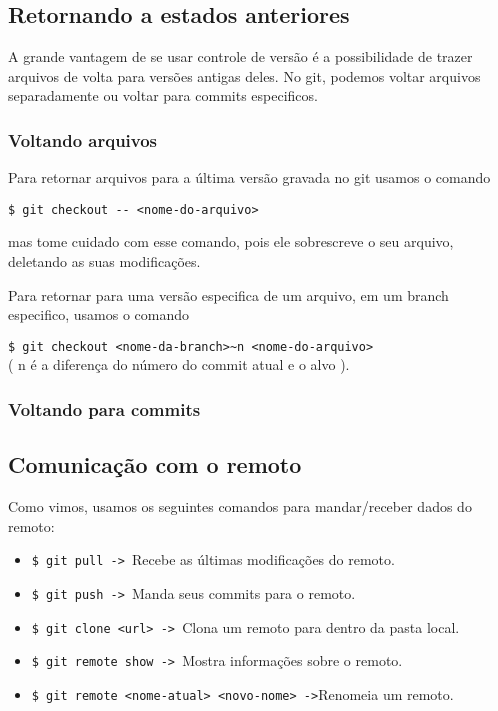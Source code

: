 \documentclass{article}
\begin{document}
\subsection{Retornando a estados anteriores}
    A grande vantagem de se usar controle de versão é a possibilidade de trazer
arquivos de volta para versões antigas deles. No git, podemos voltar arquivos
separadamente ou voltar para commits especificos.

\subsubsection{Voltando arquivos}
    Para retornar arquivos para a última versão gravada no git usamos o comando
    \begin{tabbing}
        \hspace{1cm}\=\verb#$ git checkout -- <nome-do-arquivo>#
    \end{tabbing}
mas tome cuidado com esse comando, pois ele sobrescreve o seu arquivo, deletando
as suas modificações.
    
    Para retornar para uma versão especifica de um arquivo, em um branch especifico,
usamos o comando
    \begin{tabbing}
        \hspace{1cm}\=\verb#$ git checkout <nome-da-branch>~n <nome-do-arquivo># \\
                    \>( n é  a diferença do número do commit atual e o alvo ).
    \end{tabbing}
    
\subsubsection{Voltando para commits}
\subsection{Comunicação com o remoto}
    Como vimos, usamos os seguintes comandos para mandar/receber dados do remoto:
    \begin{itemize}
        \item \verb#$ git pull -> #Recebe as últimas modificações do remoto.
        \item \verb#$ git push -> #Manda seus commits para o remoto.
        \item \verb#$ git clone <url> -> #Clona um remoto para dentro da pasta local.
        \item \verb#$ git remote show -> #Mostra informações sobre o remoto.
        \item \verb#$ git remote <nome-atual> <novo-nome> ->#Renomeia um remoto.
    \end{itemize}
\end{document}
